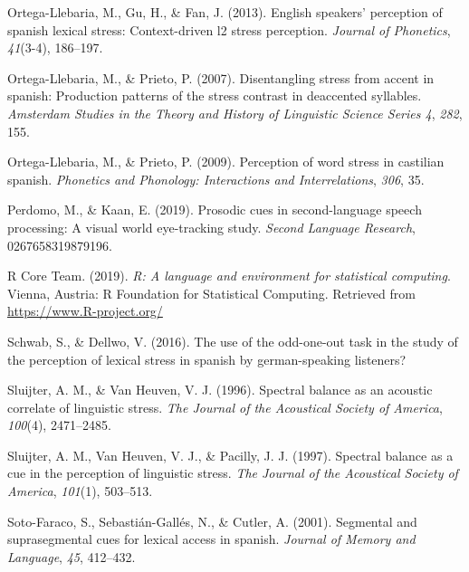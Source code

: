 \documentclass[english,man]{apa6}
\begin{document}
\leavevmode\hypertarget{ref-ortega2013english}{}%
Ortega-Llebaria, M., Gu, H., \& Fan, J. (2013). English speakers' perception of spanish lexical stress: Context-driven l2 stress perception. \emph{Journal of Phonetics}, \emph{41}(3-4), 186--197.

\leavevmode\hypertarget{ref-ortega2007disentangling}{}%
Ortega-Llebaria, M., \& Prieto, P. (2007). Disentangling stress from accent in spanish: Production patterns of the stress contrast in deaccented syllables. \emph{Amsterdam Studies in the Theory and History of Linguistic Science Series 4}, \emph{282}, 155.

\leavevmode\hypertarget{ref-ortega2009perception}{}%
Ortega-Llebaria, M., \& Prieto, P. (2009). Perception of word stress in castilian spanish. \emph{Phonetics and Phonology: Interactions and Interrelations}, \emph{306}, 35.

\leavevmode\hypertarget{ref-perdomo2019prosodic}{}%
Perdomo, M., \& Kaan, E. (2019). Prosodic cues in second-language speech processing: A visual world eye-tracking study. \emph{Second Language Research}, 0267658319879196.

\leavevmode\hypertarget{ref-R-base}{}%
R Core Team. (2019). \emph{R: A language and environment for statistical computing}. Vienna, Austria: R Foundation for Statistical Computing. Retrieved from \url{https://www.R-project.org/}

\leavevmode\hypertarget{ref-schwab2016use}{}%
Schwab, S., \& Dellwo, V. (2016). The use of the odd-one-out task in the study of the perception of lexical stress in spanish by german-speaking listeners?

\leavevmode\hypertarget{ref-sluijter1996spectral}{}%
Sluijter, A. M., \& Van Heuven, V. J. (1996). Spectral balance as an acoustic correlate of linguistic stress. \emph{The Journal of the Acoustical Society of America}, \emph{100}(4), 2471--2485.

\leavevmode\hypertarget{ref-sluijter1997spectral}{}%
Sluijter, A. M., Van Heuven, V. J., \& Pacilly, J. J. (1997). Spectral balance as a cue in the perception of linguistic stress. \emph{The Journal of the Acoustical Society of America}, \emph{101}(1), 503--513.

\leavevmode\hypertarget{ref-soto2001segmental}{}%
Soto-Faraco, S., Sebastián-Gallés, N., \& Cutler, A. (2001). Segmental and suprasegmental cues for lexical access in spanish. \emph{Journal of Memory and Language}, \emph{45}, 412--432.

\endgroup
\end{document}
